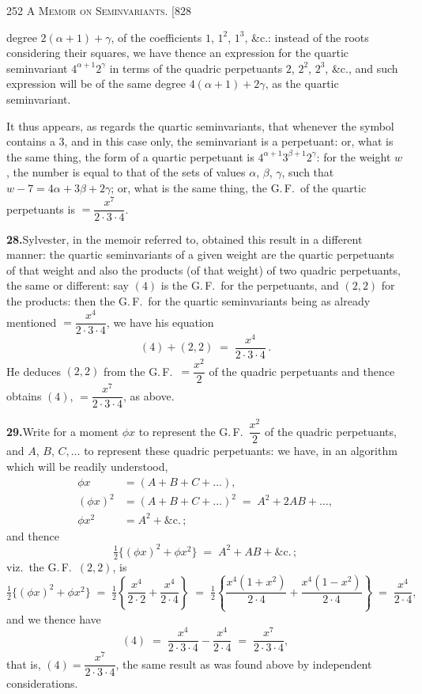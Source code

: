 \documentclass[11pt]{article}
\begin{document}
\newpage
\noindent\textsc{252 \hfill A Memoir on Seminvariants. \hfill [828}
\vspace{0.6em}

\noindent degree $2(\alpha+1)+\gamma$, of the coefficients $1$, $1^{2}$, $1^{3}$, \&c.:
instead of the roots considering their squares, we have thence an expression for the
quartic seminvariant $4^{\alpha+1}2^{\gamma}$ in terms of the quadric perpetuants $2$,
$2^{2}$, $2^{3}$, \&c., and such expression will be of the same degree $4(\alpha+1)+2\gamma$,
as the quartic seminvariant.

\medskip
It thus appears, as regards the quartic seminvariants, that whenever the symbol
contains a $3$, and in this case only, the seminvariant is a perpetuant: or, what is
the same thing, the form of a quartic perpetuant is $4^{\alpha+1}3^{\beta+1}2^{\gamma}$:
for the weight $w$, the number is equal to that of the sets of values $\alpha$, $\beta$,
$\gamma$, such that $w-7=4\alpha+3\beta+2\gamma$; or, what is the same thing, the
G.\,F.\ of the quartic perpetuants is $=\dfrac{x^{7}}{2\cdot 3\cdot 4}$.

\medskip
\noindent\textbf{28.}\quad Sylvester, in the memoir referred to, obtained this result
in a different manner: the quartic seminvariants of a given weight are the quartic
perpetuants of that weight and also the products (of that weight) of two quadric
perpetuants, the same or different: say $(4)$ is the G.\,F.\ for the perpetuants, and
$(2,2)$ for the products: then the G.\,F.\ for the quartic seminvariants being as
already mentioned $=\dfrac{x^{4}}{2\cdot 3\cdot 4}$, we have his equation
\[
(4)+(2,2) \;=\; \frac{x^{4}}{2\cdot 3\cdot 4}\,.
\]
He deduces $(2,2)$ from the G.\,F.\ $=\dfrac{x^{2}}{2}$ of the quadric perpetuants
and thence obtains $(4)$, $=\dfrac{x^{7}}{2\cdot 3\cdot 4}$, as above.

\medskip
\noindent\textbf{29.}\quad Write for a moment $\phi x$ to represent the G.\,F.\
$\dfrac{x^{2}}{2}$ of the quadric perpetuants, and $A$, $B$, $C,\ldots$ to represent
these quadric perpetuants: we have, in an algorithm which will be readily understood,
\[
\begin{aligned}
\phi x &= (A+B+C+\ldots),\\
(\phi x)^{2} &= (A+B+C+\ldots)^{2} \;=\; A^{2}+2AB+\ldots,\\
\phi x^{2} &= A^{2}+\&\text{c.}\,;
\end{aligned}
\]
and thence
\[
\tfrac{1}{2}\bigl\{(\phi x)^{2}+\phi x^{2}\bigr\} \;=\; A^{2}+AB+\&\text{c.}\,;
\]
viz.\ the G.\,F.\ $(2,2)$, is
\[
\tfrac{1}{2}\bigl\{(\phi x)^{2}+\phi x^{2}\bigr\} \;=\; \tfrac{1}{2}\!\left\{\frac{x^{4}}{2\cdot 2}+\frac{x^{4}}{2\cdot 4}\right\}
\;=\;\tfrac{1}{2}\!\left\{\frac{x^{4}(1+x^{2})}{2\cdot 4}+\frac{x^{4}(1-x^{2})}{2\cdot 4}\right\}
\;=\;\frac{x^{4}}{2\cdot 4},
\]
and we thence have
\[
(4) \;=\; \frac{x^{4}}{2\cdot 3\cdot 4} - \frac{x^{4}}{2\cdot 4} \;=\; \frac{x^{7}}{2\cdot 3\cdot 4},
\]
that is, $(4)=\dfrac{x^{7}}{2\cdot 3\cdot 4}$, the same result as was found above by
independent considerations.
\end{document}
